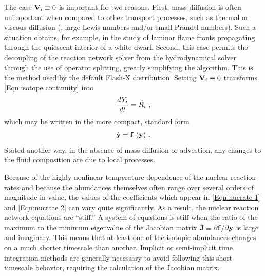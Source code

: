 The case $\textbf{V}_i\equiv 0$ is important for two reasons. First,
mass diffusion is often unimportant when compared to other transport
processes, such as thermal or viscous diffusion (\ie, large Lewis
numbers and/or small Prandtl numbers). Such a situation obtains, for
example, in the study of laminar flame fronts propagating through
the quiescent interior of a white dwarf. Second, this case permits
the decoupling of the reaction network solver from the
hydrodynamical solver through the use of operator splitting, greatly
simplifying the algorithm.  This is the method used by the default
Flash-X distribution. Setting $\textbf{V}_i\equiv 0$ transforms
\eqref{Eqn:isotope continuity} into
\begin{equation}
\label{Eqn:nucrate 1}
{dY_i\over dt} = \dot{R_i}\ ,
\end{equation}
which may be written in the more compact, standard form
\begin{equation}
\label{Eqn:nucrate 2}
\dot {{\bf y}} = {\bf f} \ ({\bf y})\ .
\end{equation}
Stated another way, in the absence of mass diffusion or advection,
any changes to the fluid composition are due to local processes.

Because of the highly nonlinear temperature dependence of the
nuclear reaction rates and because the abundances themselves often
range over several orders of magnitude in value, the values of the
coefficients which appear in \eqref{Eqn:nucrate 1} and
\eqref{Eqn:nucrate 2} can vary quite significantly.  As a result,
the nuclear reaction network equations are ``stiff.'' A system of
equations is stiff when the ratio of the maximum to the minimum
eigenvalue of the Jacobian matrix ${\tilde {\bf
J}}\equiv\partial{{\bf f}}/\partial{{\bf y}}$ is large and
imaginary. This means that at least one of the isotopic abundances
changes on a much shorter timescale than another.  Implicit or
semi-implicit time integration methods are generally necessary to
avoid following this short-timescale behavior, requiring the
calculation of the Jacobian matrix.

